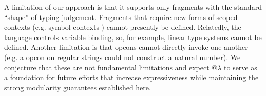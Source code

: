 \documentclass[pldi]{sigplanconf-pldi15}
\begin{document}
A limitation of our approach is that it supports only  fragments with the standard ``shape'' of typing judgement. Fragments that require new forms of scoped contexts (e.g. symbol contexts \cite{pfpl}) cannot presently be defined. Relatedly, the language controls variable binding, so, for example, linear  type systems cannot be defined. Another limitation is that opcons cannot directly invoke one another (e.g. a  opcon on regular strings could not construct a natural number). We conjecture that these are not fundamental limitations and expect @$\lambda$ to serve as a  foundation for future efforts that increase  expressiveness while maintaining the strong modularity guarantees established  here. %



\end{document}
